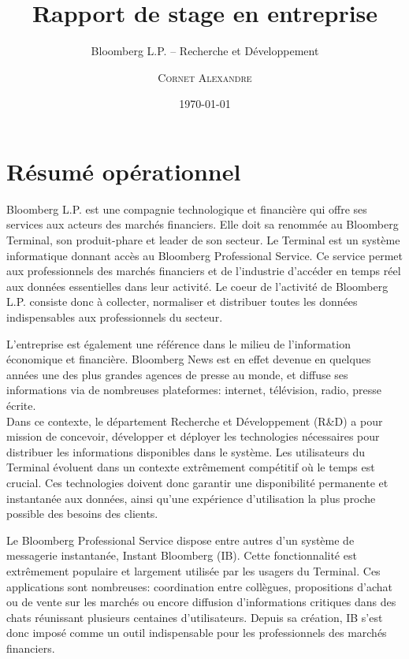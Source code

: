 \documentclass[11pt, oneside, titlepage, a4paper]{article}
\title{Rapport de stage en entreprise}
\subtitle{Bloomberg L.P. -- Recherche et Développement}
\author{\textsc{Cornet Alexandre}}
\date{\today}
\begin{document}
\maketitle
\section*{Résumé opérationnel}
\begin{small}
Bloomberg L.P. est une compagnie technologique et financière qui offre ses services aux acteurs des marchés financiers. Elle doit sa renommée au Bloomberg Terminal, son produit-phare et leader de son secteur. Le Terminal est un système informatique donnant accès au Bloomberg Professional Service. Ce service permet aux professionnels des marchés financiers et de l'industrie d'accéder en temps réel aux données essentielles dans leur activité. Le coeur de l'activité de Bloomberg L.P. consiste donc à collecter, normaliser et distribuer toutes les données indispensables aux professionnels du secteur.

L'entreprise est également une référence dans le milieu de l'information économique et financière. Bloomberg News est en effet devenue en quelques années une des plus grandes agences de presse au monde, et diffuse ses informations via de nombreuses plateformes: internet, télévision, radio, presse écrite.
\\

Dans ce contexte, le département Recherche et Développement (R\&D) a pour mission de concevoir, développer et déployer les technologies nécessaires pour distribuer les informations disponibles dans le système. Les utilisateurs du Terminal évoluent dans un contexte extrêmement compétitif où le temps est crucial. Ces technologies doivent donc garantir une disponibilité permanente et instantanée aux données, ainsi qu'une expérience d'utilisation la plus proche possible des besoins des clients.

Le Bloomberg Professional Service dispose entre autres d'un système de messagerie instantanée, Instant Bloomberg (IB). Cette fonctionnalité est extrêmement populaire et largement utilisée par les usagers du Terminal. Ces applications sont nombreuses: coordination entre collègues, propositions d'achat ou de vente sur les marchés ou encore diffusion d'informations critiques dans des chats réunissant plusieurs centaines d'utilisateurs. Depuis sa création, IB s'est donc imposé comme un outil indispensable pour les professionnels des marchés financiers.
\\


\end{small}
\end{document}
